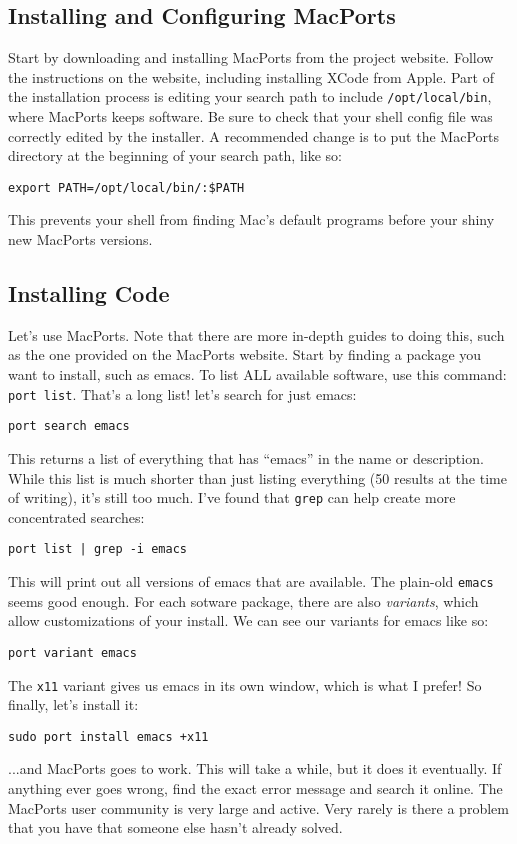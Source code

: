 \documentclass[12pt, letterpaper]{article}
\begin{document}
\subsection{Installing and Configuring MacPorts}
Start by downloading and installing MacPorts from the
project website.  Follow the instructions on the website, including installing
XCode from Apple.  Part of the installation process is editing your search
path to include {\tt /opt/local/bin}, where MacPorts keeps software.
Be sure to check that your shell config file was correctly edited by the
installer.  A recommended change is to put the MacPorts directory at the
beginning of your search path, like so:
\begin{verbatim}
export PATH=/opt/local/bin/:$PATH
\end{verbatim}
This prevents your shell from finding Mac's default programs before your
shiny new MacPorts versions.

\subsection{Installing Code}
Let's use MacPorts.  Note that there are more in-depth guides to doing this,
such as the one provided on the MacPorts website.
Start by finding a package you want to install, such as
emacs.  To list ALL available software, use this command: {\tt port list}.
That's a long list!  let's search for just emacs:
\begin{verbatim}
port search emacs
\end{verbatim}
This returns a list of everything that has ``emacs'' in the name or description.
While this list is much shorter than just listing everything (50 results at the time
of writing), it's still too much.
I've found that {\tt grep} can help create more concentrated searches:
\begin{verbatim}
port list | grep -i emacs
\end{verbatim}
This will print out all versions of emacs that are available.  The plain-old
{\tt emacs} seems good enough.  For each sotware package, there are also
\emph{variants}, which allow customizations of your install.  We can
see our variants for emacs like so:
\begin{verbatim}
port variant emacs
\end{verbatim}
The {\tt x11} variant gives us emacs in its own window, which is what I
prefer!  So finally, let's install it:
\begin{verbatim}
sudo port install emacs +x11
\end{verbatim}
...and MacPorts goes to work. This will take a while, but it does it
eventually.  If anything ever goes wrong, find the exact error message and
search it online.  The MacPorts user community is very large and active.
Very rarely is there a problem that you have that someone else hasn't already
solved.
\end{document}
